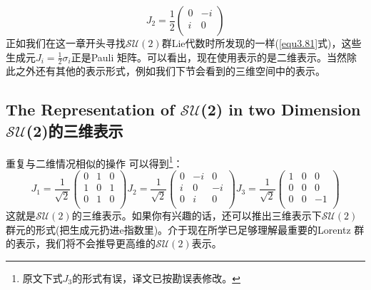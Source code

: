 \begin{equation}\label{equ3.120}
    J_2=\frac{1}{2}\left(
                   \begin{array}{cc}
                     0 & -i \\
                     i & 0 \\
                   \end{array}
                 \right)
\end{equation}
正如我们在这一章开头寻找$\mathcal{SU}(2)$群Lie代数时所发现的一样(\eqref{equ3.81}式)，这些生成元$J_i=\frac{1}{2}\sigma_i$正是Pauli 矩阵。可以看出，现在使用表示的是二维表示。当然除此之外还有其他的表示形式，例如我们下节会看到的三维空间中的表示。
\subsection[$\mathcal{SU}$(2)的三维表示]{The Representation of $\mathcal{SU}$(2) in two Dimension $\mathcal{SU}$(2)的三维表示}
\label{sec3.6.5}
重复与二维情况相似的操作 可以得到\footnote{原文下式$J_3$的形式有误，译文已按勘误表修改。}：
\begin{equation}\label{equ3.121}
J_1=\frac{1}{\sqrt{2}}\left(
\begin{array}{ccc}
0& 1 & 0 \\
1 & 0 & 1 \\
0 & 1 & 0 \\
  \end{array}
\right)
J_2=\frac{1}{\sqrt{2}}\left(
\begin{array}{ccc}
0& -i & 0 \\
i & 0 & -i \\
0 & i & 0 \\
\end{array}
\right)
J_3=\frac{1}{\sqrt{2}}\left(
\begin{array}{ccc}
1 & 0 & 0 \\
0 & 0 & 0 \\
0 & 0 & -1 \\
\end{array}
\right)
\end{equation}
这就是$\mathcal{SU}(2)$的三维表示。如果你有兴趣的话，还可以推出三维表示下$\mathcal{SU}(2)$群元的形式(把生成元扔进$\mathrm{e}$指数里)。介于现在所学已足够理解最重要的Lorentz 群的表示，我们将不会推导更高维的$\mathcal{SU}(2)$表示。



